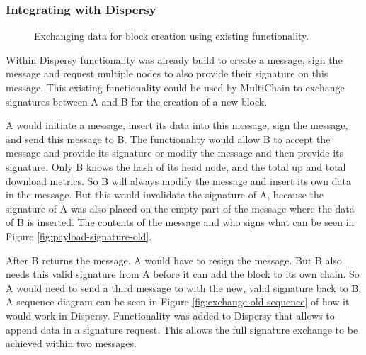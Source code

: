 \subsubsection{Integrating with Dispersy}
\begin{figure}[!h]
\centering
{}

\caption{Exchanging data for block creation using existing functionality.}
\label{fig:block-creation-old}
\end{figure}
Within Dispersy functionality was already build to create a message, sign the message
and request multiple nodes to also provide their signature on this message.
This existing functionality could be used by MultiChain to exchange signatures
between A and B for the creation of a new block.

A would initiate a message, insert its data into this message, sign the message, and send this message to B.
The functionality would allow B to accept the message and provide its signature or
modify the message and then provide its signature.
Only B knows the hash of its head node, and the total up and total download metrics.
So B will always modify the message and insert its own data in the message.
But this would invalidate the signature of A,
because the signature of A was also placed on the empty part of the message where the data of B is inserted.
The contents of the message and who signs what can be seen in Figure \ref{fig:payload-signature-old}.

After B returns the message,
A would have to resign the message.
But B also needs this valid signature from A before it can add the block to its own chain.
So A would need to send a third message to with the new, valid signature back to B.
A sequence diagram can be seen in Figure \ref{fig:exchange-old-sequence} of how it would work in Dispersy.
Functionality was added to Dispersy that allows to append data in a signature request.
This allows the full signature exchange to be achieved within two messages.